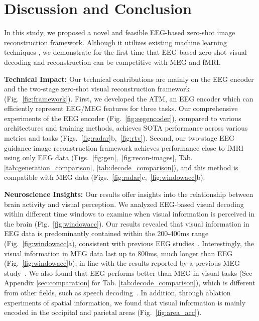 \documentclass{article}
\begin{document}
\section{Discussion and Conclusion}
\label{sec:Discussion}
In this study, we proposed a novel and feasible EEG-based zero-shot image reconstruction framework. Although it utilizes existing machine learning techniques , we demonstrate for the first time that EEG-based zero-shot visual decoding and reconstruction can be competitive with MEG and fMRI. 

\textbf{Technical Impact:} Our technical contributions are mainly on the EEG encoder and the two-stage zero-shot visual reconstruction framework (Fig.~\ref{fig:framework}). First, we developed the ATM, an EEG encoder which can efficiently represent EEG/MEG features for three tasks. Our comprehensive experiments of the EEG encoder (Fig.~\ref{fig:eegencoder}), compared to various architectures and training methods, achieves SOTA performance across various metrics and tasks (Figs.~\ref{fig:radar}b,~\ref{fig:rtv}). Second, our two-stage EEG guidance image reconstruction framework achieves performance close to fMRI using only EEG data (Figs.~\ref{fig:gen},~\ref{fig:recon-images}, Tab. \ref{tab:generation_comparison}, \ref{tab:decode_comparison}), and this method is compatible with MEG data (Figs.~\ref{fig:radar}c,~\ref{fig:windowacc}b). 


\textbf{Neuroscience Insights:} Our results offer insights into the relationship between brain activity and visual perception. We analyzed EEG-based visual decoding within different time windows to examine when visual information is perceived in the brain (Fig.~\ref{fig:windowacc}). Our results revealed that visual information in EEG data is predominantly contained within the 200-400ms range (Fig.~\ref{fig:windowacc}a), consistent with previous EEG studies~\cite{teichmann2023multidimensional,grootswagers2022human,song2023decoding}. 
Interestingly, the visual information in MEG data last up to 800ms, much longer than EEG (Fig.~\ref{fig:windowacc}b), in line with the results reported by a previous MEG study~\cite{Benchetrit_2023, song2023decoding}.
We also found that EEG performs better than MEG in visual tasks (See Appendix \ref{sec:comparation} for Tab. \ref{tab:decode_comparison}), which is different from other fields, such as speech decoding~\cite{defossez2023decoding}.
In addition, through ablation experiments of spatial information, we found that visual information is mainly encoded in the occipital and parietal areas (Fig.~\ref{fig:area_acc}). 
\end{document}

